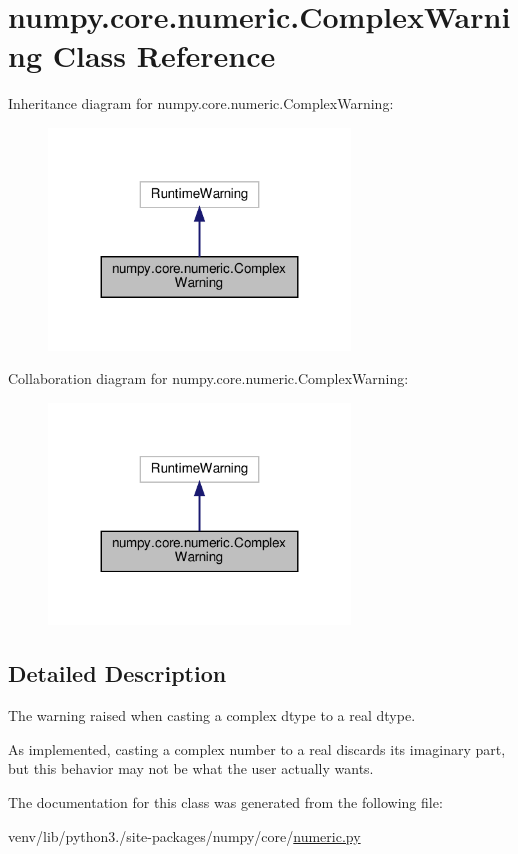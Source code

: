 \hypertarget{classnumpy_1_1core_1_1numeric_1_1ComplexWarning}{}\section{numpy.\+core.\+numeric.\+Complex\+Warning Class Reference}
\label{classnumpy_1_1core_1_1numeric_1_1ComplexWarning}


Inheritance diagram for numpy.\+core.\+numeric.\+Complex\+Warning\+:
\nopagebreak
\begin{figure}[H]
\begin{center}
\leavevmode
\includegraphics[width=227pt]{classnumpy_1_1core_1_1numeric_1_1ComplexWarning__inherit__graph}
\end{center}
\end{figure}


Collaboration diagram for numpy.\+core.\+numeric.\+Complex\+Warning\+:
\nopagebreak
\begin{figure}[H]
\begin{center}
\leavevmode
\includegraphics[width=227pt]{classnumpy_1_1core_1_1numeric_1_1ComplexWarning__coll__graph}
\end{center}
\end{figure}


\subsection{Detailed Description}
\begin{DoxyVerb}The warning raised when casting a complex dtype to a real dtype.

As implemented, casting a complex number to a real discards its imaginary
part, but this behavior may not be what the user actually wants.\end{DoxyVerb}
 

The documentation for this class was generated from the following file\+:\begin{DoxyCompactItemize}
\item 
venv/lib/python3./site-\/packages/numpy/core/\hyperlink{core_2numeric_8py}{numeric.\+py}\end{DoxyCompactItemize}
